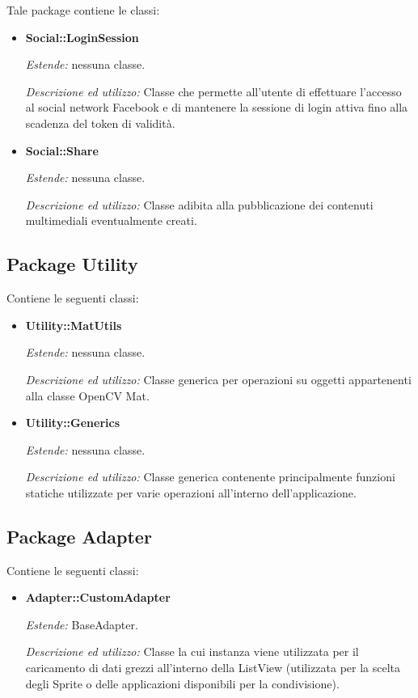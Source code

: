 Tale package contiene le classi:
\begin{itemize}
\item \textbf{Social::LoginSession}

\textit{Estende:} nessuna classe.

\textit{Descrizione ed utilizzo:} Classe che permette all'utente di effettuare l'accesso al social network Facebook e di mantenere la sessione di login attiva fino alla scadenza del token di validità.

\item \textbf{Social::Share}

\textit{Estende:} nessuna classe.

\textit{Descrizione ed utilizzo:} Classe adibita alla pubblicazione dei contenuti multimediali eventualmente creati.
\end{itemize}

\subsection{Package Utility}
Contiene le seguenti classi:

\begin{itemize}

\item \textbf{Utility::MatUtils}

\textit{Estende:} nessuna classe.

\textit{Descrizione ed utilizzo:} Classe generica per operazioni su oggetti appartenenti alla classe OpenCV Mat.

\item \textbf{Utility::Generics}

\textit{Estende:} nessuna classe.

\textit{Descrizione ed utilizzo:} Classe generica contenente principalmente funzioni statiche utilizzate per varie operazioni all'interno dell'applicazione.
\end{itemize}


\subsection{Package Adapter}
Contiene le seguenti classi:

\begin{itemize}

\item \textbf{Adapter::CustomAdapter}

\textit{Estende:} BaseAdapter.

\textit{Descrizione ed utilizzo:} Classe la cui instanza viene utilizzata per il caricamento di dati grezzi all'interno della ListView (utilizzata per la scelta degli Sprite o delle applicazioni disponibili per la condivisione).

\end{itemize}

